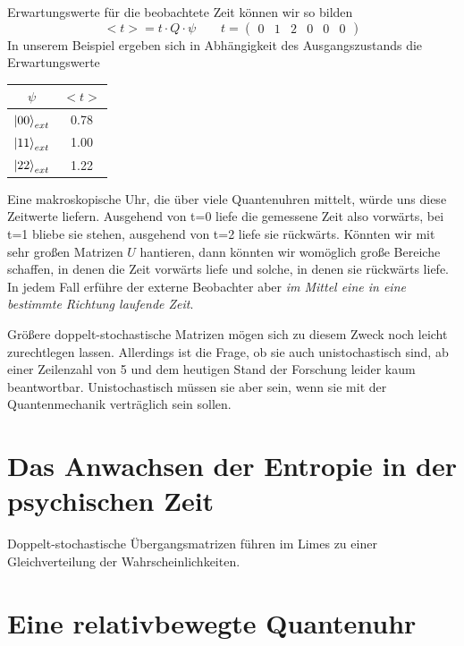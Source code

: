 \documentclass[12pt]{article}
\begin{document}
Erwartungswerte für die beobachtete Zeit können wir so bilden
\begin{equation*}
<t> = t \cdot Q \cdot \psi \quad\quad t = \begin{pmatrix}
0&1&2&0&0&0
\end{pmatrix}
\end{equation*}
In unserem Beispiel ergeben sich in Abhängigkeit des Ausgangszustands die Erwartungswerte
\begin{center}
\begin{tabular}{ |c|c| } 
 \hline
 $\psi$ & $<t>$ \\ 
 \hline
 $\ket{00}_{ext}$ & 0.78 \\ 
 $\ket{11}_{ext}$ & 1.00 \\ 
 $\ket{22}_{ext}$ & 1.22 \\
 \hline
\end{tabular}
\end{center}
Eine makroskopische Uhr, die über viele Quantenuhren mittelt, würde uns diese Zeitwerte liefern.
Ausgehend von t=0 liefe die gemessene Zeit also vorwärts, bei t=1 bliebe sie stehen, ausgehend von t=2 liefe sie rückwärts. Könnten wir mit sehr großen Matrizen $U$ hantieren, dann könnten wir womöglich große Bereiche schaffen, in denen die Zeit vorwärts liefe und solche, in denen sie rückwärts liefe. In jedem Fall erführe der externe Beobachter aber \emph{im Mittel eine in eine bestimmte Richtung laufende Zeit}.

Größere doppelt-stochastische Matrizen mögen sich zu diesem Zweck noch leicht zurechtlegen lassen. Allerdings ist die Frage, ob sie auch unistochastisch sind, ab einer Zeilenzahl von 5 und dem heutigen Stand der Forschung leider kaum beantwortbar. Unistochastisch müssen sie aber sein, wenn sie mit der Quantenmechanik verträglich sein sollen.

\section{Das Anwachsen der Entropie in der psychischen Zeit}

Doppelt-stochastische Übergangsmatrizen führen im Limes zu einer Gleichverteilung der Wahrscheinlichkeiten.


\section{Eine relativbewegte Quantenuhr}
\end{document}
